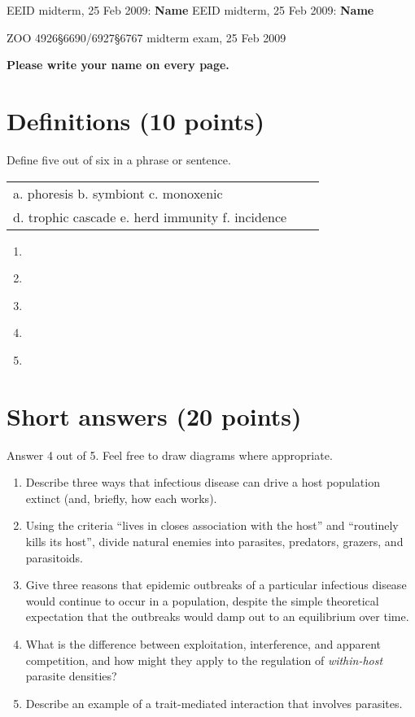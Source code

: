 \documentclass[12pt]{article}
\begin{document}
\newcommand{\answerboxwidth}{15cm}
\newcommand{\answerbox}[1]{\parbox[t][#1]{\answerboxwidth}{\ }}
\newcommand{\alphlist}{\renewcommand{\labelenumi}{\alph{enumi}.}}
\newcommand{\numlist}{\renewcommand{\labelenumi}{\arabic{enumi}.}}
\markboth%
{EEID midterm, 25 Feb 2009: \textbf{Name }}%
{EEID midterm, 25 Feb 2009: \textbf{Name }}

\begin{center}
\LARGE{ZOO 4926\S6690/6927\S6767 midterm exam, 25 Feb 2009}
\end{center}
\textbf{Please write your name on every page.}

\section{Definitions (10 points)}
Define five out of six in a phrase or sentence. \\
\begin{tabular}{lll}
a. phoresis b. symbiont c. monoxenic \\
d. trophic cascade e. herd immunity f. incidence
\end{tabular}
\newcommand{\defbox}{\answerbox{40pt}}
\numlist
\begin{enumerate}
\item{\defbox}
\item{\defbox}
\item{\defbox}
\item{\defbox}
\item{\defbox}
\end{enumerate}

\section{Short answers (20 points)}
Answer 4 out of 5.  Feel free to draw diagrams where appropriate.

\alphlist
\begin{enumerate}
\item Describe three ways that infectious disease can drive a host   population extinct (and, briefly, how each works).
\item Using the criteria ``lives in closes association with the host''  and ``routinely kills its host'', divide natural enemies into parasites, predators, grazers, and parasitoids. 
\item Give three reasons that epidemic outbreaks of a particular infectious disease would continue to occur in a population, despite the simple theoretical expectation that the outbreaks would damp out to an equilibrium over time.
\item What is the difference between exploitation, interference, and apparent competition, and how might they apply to the regulation of \emph{within-host} parasite densities?
\item Describe an example of a trait-mediated interaction that
involves parasites.
\end{enumerate}
\end{document}
